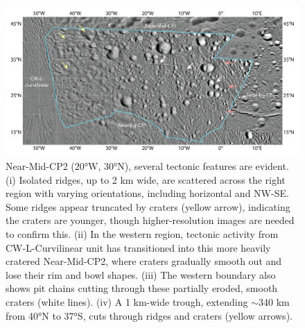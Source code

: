\documentclass[preprint,11pt,3p,times,authoryear]{elsarticle}
\begin{document}
{\begin{figure}[t]
    \includegraphics[width=1.0\linewidth]{fig/FigS4B_Near-Mid-CP2.png}
    \caption{Near-Mid-CP2 (20°W, 30°N), several tectonic features are evident. (i) Isolated ridges, up to 2 km wide, are scattered across the right region with varying orientations, including horizontal and NW-SE. Some ridges appear truncated by craters (yellow arrow), indicating the craters are younger, though higher-resolution images are needed to confirm this. (ii) In the western region, tectonic activity from CW-L-Curvilinear unit has transitioned into this more heavily cratered Near-Mid-CP2, where craters gradually smooth out and lose their rim and bowl shapes. (iii) The western boundary also shows pit chains cutting through these partially eroded, smooth craters (white lines). (iv) A 1 km-wide trough, extending $\sim$340 km from 40°N to 37°S, cuts through ridges and craters (yellow arrows).}
    \label{fig:app_erosion2}
\end{figure}

}
\end{document}
